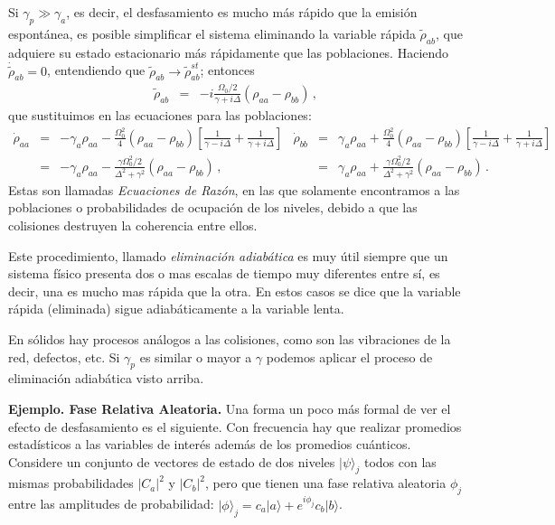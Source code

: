 \documentclass[12pt]{report}
\providecommand{\ket}[1]{\lvert #1 \rangle}
\begin{document}
Si $\gamma_p \gg \gamma_a$, es decir, el desfasamiento es mucho 
m\'as r\'apido que la emisi\'on espont\'anea, es posible simplificar el 
sistema eliminando la variable r\'apida $\tilde{\rho}_{ab}$, que adquiere 
su estado estacionario m\'as r\'apidamente que las poblaciones. 
Haciendo $\dot{\tilde{\rho}}_{ab} =0$, entendiendo que 
$\tilde{\rho}_{ab} \to \tilde{\rho}_{ab}^{st}$; 
entonces 
%
\begin{eqnarray}
\tilde{\rho}_{ab} &=& 
	- i \frac{\Omega_0/2}{\gamma +i\Delta} (\rho_{aa} - \rho_{bb}) \,, 
\end{eqnarray}
que sustituimos en las ecuaciones para las poblaciones: 
%
\begin{subequations}
\begin{eqnarray}
\dot{\rho}_{aa} &=&  -\gamma_a \rho_{aa}  
	- \frac{\Omega_0^2}{4} ( \rho_{aa} - \rho_{bb})  
	\left[ \frac{1}{\gamma -i \Delta} + \frac{1}{\gamma +i\Delta} \right]   
	\nonumber \\ 
&=& -\gamma_a \rho_{aa} 
	- \frac{ \gamma \Omega_0^2/2 }{ \Delta^2 +\gamma^2 } 
	( \rho_{aa} - \rho_{bb}) 	\,, 
\end{eqnarray}
%
\begin{eqnarray}
\dot{\rho}_{bb} &=&  \gamma_a \rho_{aa}  
	+ \frac{\Omega_0^2}{4} ( \rho_{aa} - \rho_{bb})  
	\left[ \frac{1}{\gamma -i \Delta} + \frac{1}{\gamma +i\Delta} \right]    
	\nonumber \\ 
&=& \gamma_a \rho_{aa} 
	+ \frac{ \gamma \Omega_0^2/2 }{ \Delta^2 +\gamma^2 } 
	( \rho_{aa} - \rho_{bb}) 	\,. 
\end{eqnarray}
\end{subequations}
Estas son llamadas \textit{Ecuaciones de Raz\'on}, en las que solamente 
encontramos a las poblaciones o probabilidades de ocupaci\'on de los 
niveles, debido a que las colisiones destruyen la coherencia entre ellos. 

Este procedimiento, llamado \textit{eliminaci\'on adiab\'atica} es muy \'util 
siempre que un sistema f\'isico presenta dos o mas escalas de tiempo 
muy diferentes entre s\'i, es decir, una es mucho mas r\'apida que la otra. 
En estos casos se dice que la variable r\'apida (eliminada) sigue 
adiab\'aticamente a la variable lenta. 

En s\'olidos hay procesos an\'alogos a las colisiones, como son las 
vibraciones de la red, defectos, etc. Si $\gamma_p$ es similar o mayor a 
$\gamma$ podemos aplicar el proceso de eliminaci\'on adiab\'atica visto 
arriba. 

\textbf{Ejemplo. Fase Relativa Aleatoria.}
Una forma un poco m\'as formal de ver el efecto de desfasamiento es el  
siguiente. Con frecuencia hay que realizar promedios estad\'isticos a las 
variables de inter\'es adem\'as de los promedios cu\'anticos. Considere 
un conjunto de vectores de estado de dos niveles $\ket{\psi}_j$ todos 
con las mismas probabilidades $|C_a|^2$ y $|C_b|^2$, pero que tienen 
una fase relativa aleatoria $\phi_j$ entre las amplitudes de probabilidad: 
$\ket{\phi}_j = c_a \ket{a} + e^{i \phi_j} c_b \ket{b}$. 
\end{document}
